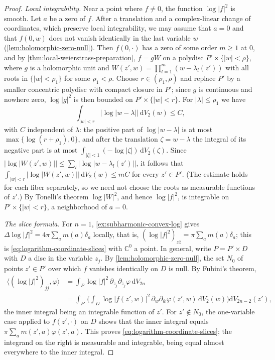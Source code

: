 \begin{proof}
\emph{Local integrability.} Near a point where $f\neq0$, the function $\log|f|^2$ is smooth. Let $a$ be a zero of $f$. After a translation and a complex-linear change of coordinates, which preserve local integrability, we may assume that $a=0$ and that $f(0,w)$ does not vanish identically in the last variable $w$ (\cref{lem:holomorphic-zero-null}). Then $f(0,\cdot)$ has a zero of some order $m\geq1$ at $0$, and by \cref{thm:local-weierstrass-preparation}, $f=gW$ on a polydisc $P'\times\{|w|<\rho\}$, where $g$ is a holomorphic unit and $W(z',w)=\prod_{l=1}^m(w-\lambda_l(z'))$ with all roots in $\{|w|<\rho_1\}$ for some $\rho_1<\rho$. Choose $r\in(\rho_1,\rho)$ and replace $P'$ by a smaller concentric polydisc with compact closure in $P'$; since $g$ is continuous and nowhere zero, $\log|g|^2$ is then bounded on $P'\times\{|w|<r\}$. For $|\lambda|\leq\rho_1$ we have
\[
 \int_{|w|<r}\big|\log|w-\lambda|\big|\,\mathrm{d}V_2(w)\le C,
\]
with $C$ independent of $\lambda$: the positive part of $\log|w-\lambda|$ is at most $\max\{\log(r+\rho_1),0\}$, and after the translation $\zeta=w-\lambda$ the integral of its negative part is at most $\int_{|\zeta|<1}(-\log|\zeta|)\,\mathrm dV_2(\zeta)$. Since $|\log|W(z',w)||\leq\sum_l|\log|w-\lambda_l(z')||$, it follows that $\int_{|w|<r}|\log|W(z',w)||\,\mathrm dV_2(w)\leq mC$ for every $z'\in P'$. (The estimate holds for each fiber separately, so we need not choose the roots as measurable functions of $z'$.) By Tonelli's theorem $\log|W|^2$, and hence $\log|f|^2$, is integrable on $P'\times\{|w|<r\}$, a neighborhood of $a=0$.

\emph{The slice formula.} For $n=1$, \cref{ex:subharmonic-convex-log} gives $\Delta\log|f|^2=4\pi\sum_am(a)\delta_a$ locally, that is, $(\log|f|^2)_{z\bar z}=\pi\sum_am(a)\delta_a$; this is \eqref{eq:logarithm-coordinate-slices} with $\mathbb C^0$ a point. In general, write $P=P'\times D$ with $D$ a disc in the variable $z_j$. By \cref{lem:holomorphic-zero-null}, the set $N_0$ of points $z'\in P'$ over which $f$ vanishes identically on $D$ is null. By Fubini's theorem,
\begin{align*}
 \big\langle(\log|f|^2)_{j\bar j},\varphi\big\rangle&=\int_P\log|f|^2\,\partial_{z_j}\partial_{\bar z_j}\varphi\,\mathrm dV_{2n}\\
 &=\int_{P'}\Big(\int_D\log|f(z',w)|^2\,\partial_w\partial_{\bar w}\varphi(z',w)\,\mathrm dV_2(w)\Big)\mathrm dV_{2n-2}(z'),
\end{align*}
the inner integral being an integrable function of $z'$. For $z'\notin N_0$, the one-variable case applied to $f(z',\cdot)$ on $D$ shows that the inner integral equals $\pi\sum_am(z',a)\varphi(z',a)$. This proves \eqref{eq:logarithm-coordinate-slices}; the integrand on the right is measurable and integrable, being equal almost everywhere to the inner integral.


\end{proof}
